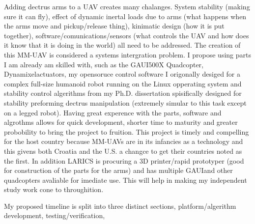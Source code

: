 \documentclass[12pt]{article}
\begin{document}
Adding dectrus arms to a UAV creates many chalanges.  System stability (making sure it can fly), effect of dynamic inertal loads due to arms (what happens when the arms move and pickup/release thing), kinimatic design (how it is put together), software/comunications/sensors (what controls the UAV and how does it know that it is doing in the world) all need to be addressed.  The creation of this MM-UAV is considered a systems intergration problem.  I propose using parts I am already am skilled with, such as the GAUI\texttrademark 500X Quadcopter, Dynamixel\texttrademark actuators, my opensoruce control software I origonally desiged for a complex full-size humanoid robot running on the Linux opperating system and stability control algerithms from my Ph.D. dissertation spisifically designed for stability preforming dectrus manipulation (extremely simular to this task except on a legged robot).  Having great experence with the parts, software and algrothms allows for quick development, shorter time to maturity and greater probobility to bring the project to fruition.  This project is timely and compelling for the host country because MM-UAVs are in its infancies as a technology and this givens both Croatia and the U.S. a changce to get their countries noted as the first.  In addition LARICS is procuring a 3D printer/rapid prototyper (good for construction of the parts for the arms) and has multiple GAUI\texttrademark and other quadcopters avaliable for imediate use.  This will help in making my independent study work cone to throughition.

My proposed timeline is split into three distinct sections, platform/algerithm development, testing/verification, 
\end{document}
